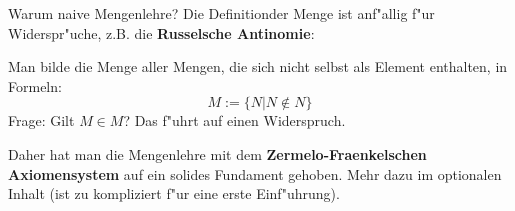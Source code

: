 \documentclass{beamer}
\begin{document}
\begin{frame}{Warum naive Mengenlehre?}
  Die \glqq Definition\grqq der Menge ist anf"allig f"ur Widerspr"uche, z.B. die \textbf{Russelsche Antinomie}:

  Man bilde die Menge aller Mengen, die sich nicht selbst als Element enthalten, in Formeln:
  \[M:=\{N|N\notin N\}\]
  Frage: Gilt $M\in M$? Das f"uhrt auf einen Widerspruch.
  
  Daher hat man die Mengenlehre mit dem \textbf{Zermelo-Fraenkelschen Axiomensystem} auf ein solides Fundament gehoben. Mehr dazu im optionalen Inhalt (ist zu kompliziert f"ur eine erste Einf"uhrung).
\end{frame}








\end{document}
